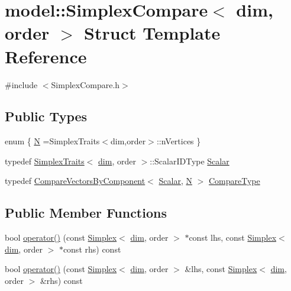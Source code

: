 \hypertarget{structmodel_1_1_simplex_compare}{}\section{model\+:\+:Simplex\+Compare$<$ dim, order $>$ Struct Template Reference}
\label{structmodel_1_1_simplex_compare}


{\ttfamily \#include $<$Simplex\+Compare.\+h$>$}

\subsection*{Public Types}
\begin{DoxyCompactItemize}
\item 
enum \{ \hyperlink{structmodel_1_1_simplex_compare_a594b8514f8618ad285f7d7135fe67067a64e4a15c8da134a4ec42c5703aa4f8ff}{N} =Simplex\+Traits$<$dim,order$>$\+:\+:n\+Vertices
 \}
\item 
typedef \hyperlink{structmodel_1_1_simplex_traits}{Simplex\+Traits}$<$ \hyperlink{plot_nd_a_8m_a382f3ca768b275b8d563604f7fc7df73}{dim}, order $>$\+::Scalar\+I\+D\+Type \hyperlink{structmodel_1_1_simplex_compare_a4e031e26c2e87d24297526d4faec6c1c}{Scalar}
\item 
typedef \hyperlink{structmodel_1_1_compare_vectors_by_component}{Compare\+Vectors\+By\+Component}$<$ \hyperlink{structmodel_1_1_simplex_compare_a4e031e26c2e87d24297526d4faec6c1c}{Scalar}, \hyperlink{structmodel_1_1_simplex_compare_a594b8514f8618ad285f7d7135fe67067a64e4a15c8da134a4ec42c5703aa4f8ff}{N} $>$ \hyperlink{structmodel_1_1_simplex_compare_a685c814e5daa2b71c02c4cd9f34b0b49}{Compare\+Type}
\end{DoxyCompactItemize}
\subsection*{Public Member Functions}
\begin{DoxyCompactItemize}
\item 
bool \hyperlink{structmodel_1_1_simplex_compare_a27589335d4c5982cecd1df22239de62c}{operator()} (const \hyperlink{classmodel_1_1_simplex}{Simplex}$<$ \hyperlink{plot_nd_a_8m_a382f3ca768b275b8d563604f7fc7df73}{dim}, order $>$ $\ast$const lhs, const \hyperlink{classmodel_1_1_simplex}{Simplex}$<$ \hyperlink{plot_nd_a_8m_a382f3ca768b275b8d563604f7fc7df73}{dim}, order $>$ $\ast$const rhs) const 
\item 
bool \hyperlink{structmodel_1_1_simplex_compare_ae5e15eeac8d6980f4cf9ade08c5c5276}{operator()} (const \hyperlink{classmodel_1_1_simplex}{Simplex}$<$ \hyperlink{plot_nd_a_8m_a382f3ca768b275b8d563604f7fc7df73}{dim}, order $>$ \&lhs, const \hyperlink{classmodel_1_1_simplex}{Simplex}$<$ \hyperlink{plot_nd_a_8m_a382f3ca768b275b8d563604f7fc7df73}{dim}, order $>$ \&rhs) const 
\end{DoxyCompactItemize}


